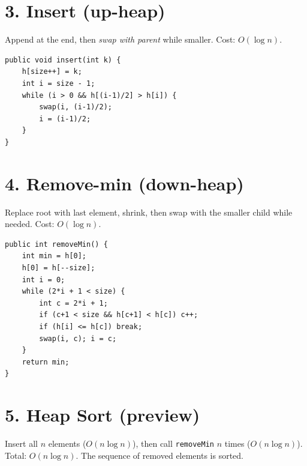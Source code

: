 \documentclass[11pt]{article}
\begin{document}
\section*{3. Insert (up-heap)}

Append at the end, then \emph{swap with parent} while smaller. Cost: $O(\log n)$.

\begin{lstlisting}
public void insert(int k) {
    h[size++] = k;
    int i = size - 1;
    while (i > 0 && h[(i-1)/2] > h[i]) {
        swap(i, (i-1)/2);
        i = (i-1)/2;
    }
}
\end{lstlisting}

\section*{4. Remove-min (down-heap)}

Replace root with last element, shrink, then swap with the smaller child while needed. Cost: $O(\log n)$.

\begin{lstlisting}
public int removeMin() {
    int min = h[0];
    h[0] = h[--size];
    int i = 0;
    while (2*i + 1 < size) {
        int c = 2*i + 1;
        if (c+1 < size && h[c+1] < h[c]) c++;
        if (h[i] <= h[c]) break;
        swap(i, c); i = c;
    }
    return min;
}
\end{lstlisting}

\section*{5. Heap Sort (preview)}

Insert all $n$ elements ($O(n\log n)$), then call \texttt{removeMin} $n$ times ($O(n\log n)$). Total: $O(n\log n)$. The sequence of removed elements is sorted.
\end{document}
